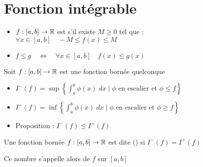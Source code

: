 \section*{Fonction intégrable}


\begin{frame}

\begin{itemize}
  \item $f : [a,b] \to \mathbb{R}$ est  s'il existe $M\ge0$ tel que : \\ \hfil\hfil $\forall x \in [a,b] \quad -M \le f(x) \le M$

\pause
  \item $f \le g  \quad \iff \quad \forall x \in [a,b] \quad f(x) \le g(x)$
\end{itemize}


\pause
Soit $f : [a,b] \to \mathbb{R}$ est une fonction bornée quelconque
\begin{itemize}

\pause
  \item $I^-(f) = \sup \left\{ \int_a^b \phi(x) \; dx \mid \phi \text{ en escalier et } \phi \le f \right\}$

\pause
  \item $I^+(f) = \inf \left\{ \int_a^b \phi(x) \; dx \mid \phi \text{ en escalier et } \phi \ge f \right\}$

\pause
  \item Proposition : $I^-(f) \le I^+(f)$
\end{itemize}

 

\pause

\begin{mydefinition}
Une fonction bornée $f :[a,b] \to \mathbb{R}$ est dite  ()
si $I^-(f) = I^+(f)$ 

\pause

Ce nombre s'appelle alors  de $f$ sur $[a,b]$

\hfil\hfil{}
\end{mydefinition}
\end{frame}

\begin{frame}
\end{frame}



